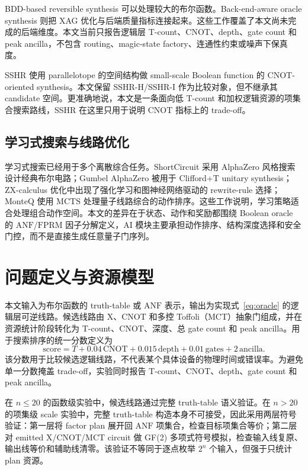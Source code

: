 \documentclass[UTF8,fontset=macnew,11pt]{ctexart}
\newcommand{\anf}{\ensuremath{\mathrm{ANF}}}
\newcommand{\fprm}{\ensuremath{\mathrm{FPRM}}}
\newcommand{\mcts}{\ensuremath{\mathrm{MCTS}}}
\newcommand{\score}{\ensuremath{\mathrm{score}}}
\newcommand{\ttable}{truth-table}
\begin{document}
BDD-based reversible synthesis 可以处理较大的布尔函数\cite{wille2009bdd}。Back-end-aware oracle synthesis 则把 XAG 优化与后端质量指标连接起来\cite{yu2025backend}。这些工作覆盖了本文尚未完成的后端维度。本文当前只报告逻辑层 T-count、CNOT、depth、gate count 和 peak ancilla，不包含 routing、magic-state factory、连通性约束或噪声下保真度。

SSHR 使用 parallelotope 的空间结构做 small-scale Boolean function 的 CNOT-oriented synthesis\cite{zheng2025sshr}。本文保留 SSHR-H/SSHR-I 作为比较对象，但不继承其 candidate 空间。更准确地说，本文是一条面向低 T-count 和加权逻辑资源的项集合搜索路线，SSHR 在这里只用于说明 CNOT 指标上的 trade-off。

\subsection{学习式搜索与线路优化}

学习式搜索已经用于多个离散综合任务。ShortCircuit 采用 AlphaZero 风格搜索设计经典布尔电路\cite{tsaras2024shortcircuit}；Gumbel AlphaZero 被用于 Clifford+T unitary synthesis\cite{rietsch2024unitary}；ZX-calculus 优化中出现了强化学习和图神经网络驱动的 rewrite-rule 选择\cite{riu2025rlzx}；MonteQ 使用 \mcts{} 处理量子线路综合的动作排序\cite{machiya2026monteq}。这些工作说明，学习策略适合处理组合动作空间。本文的差异在于状态、动作和奖励都围绕 Boolean oracle 的 \anf{}/\fprm{} 因子分解定义，AI 模块主要承担动作排序、结构深度选择和安全门控，而不是直接生成任意量子门序列。

\section{问题定义与资源模型}

本文输入为布尔函数的 \ttable{} 或 \anf{} 表示，输出为实现式~\eqref{eq:oracle} 的逻辑层可逆线路。候选线路由 X、CNOT 和多控 Toffoli（MCT）抽象门组成，并在资源统计阶段转化为 T-count、CNOT、深度、总 gate count 和 peak ancilla。用于搜索排序的统一分数定义为
\begin{equation}
  \score = T + 0.04\,\mathrm{CNOT} + 0.015\,\mathrm{depth}
         + 0.01\,\mathrm{gates} + 2\,\mathrm{ancilla}.
  \label{eq:score}
\end{equation}
该分数用于比较候选逻辑线路，不代表某个具体设备的物理时间或错误率。为避免单一分数掩盖 trade-off，实验同时报告 T-count、CNOT、depth、gate count 和 peak ancilla。

在 $n\leq20$ 的函数级实验中，候选线路通过完整 \ttable{} 语义验证。在 $n>20$ 的项集级 scale 实验中，完整 \ttable{} 构造本身不可接受，因此采用两层符号验证：第一层将 factor plan 展开回 \anf{} 项集合，检查目标项集合等价；第二层对 emitted X/CNOT/MCT circuit 做 GF(2) 多项式符号模拟，检查输入线复原、输出线等价和辅助线清零。该验证不等同于逐点枚举 $2^n$ 个输入，但强于只统计 plan 资源。
\end{document}
